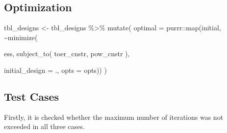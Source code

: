 \documentclass[
]{book}
\newenvironment{Shaded}{\begin{snugshade}}{\end{snugshade}}
\newcommand{\AttributeTok}[1]{\textcolor[rgb]{0.77,0.63,0.00}{#1}}
\newcommand{\FunctionTok}[1]{\textcolor[rgb]{0.00,0.00,0.00}{#1}}
\newcommand{\NormalTok}[1]{#1}
\newcommand{\OtherTok}[1]{\textcolor[rgb]{0.56,0.35,0.01}{#1}}
\newcommand{\SpecialCharTok}[1]{\textcolor[rgb]{0.00,0.00,0.00}{#1}}
\begin{document}
\hypertarget{optimization-6}{%
\subsection{Optimization}\label{optimization-6}}

\begin{Shaded}
\begin{Highlighting}[]
\NormalTok{tbl\_designs }\OtherTok{\textless{}{-}}\NormalTok{ tbl\_designs }\SpecialCharTok{\%\textgreater{}\%} 
    \FunctionTok{mutate}\NormalTok{(}
       \AttributeTok{optimal =}\NormalTok{ purrr}\SpecialCharTok{::}\FunctionTok{map}\NormalTok{(initial, }\SpecialCharTok{\textasciitilde{}}\FunctionTok{minimize}\NormalTok{(}
         
\NormalTok{          ess,}
          \FunctionTok{subject\_to}\NormalTok{(}
\NormalTok{              toer\_cnstr,}
\NormalTok{              pow\_cnstr}
\NormalTok{          ),}
          
          \AttributeTok{initial\_design =}\NormalTok{ ., }
          \AttributeTok{opts           =}\NormalTok{ opts)) )}
\end{Highlighting}
\end{Shaded}

\hypertarget{test-cases-7}{%
\subsection{Test Cases}\label{test-cases-7}}

Firstly, it is checked whether the maximum number of iterations was
not exceeded in all three cases.

\begin{Shaded}
\end{Shaded}
\end{document}
